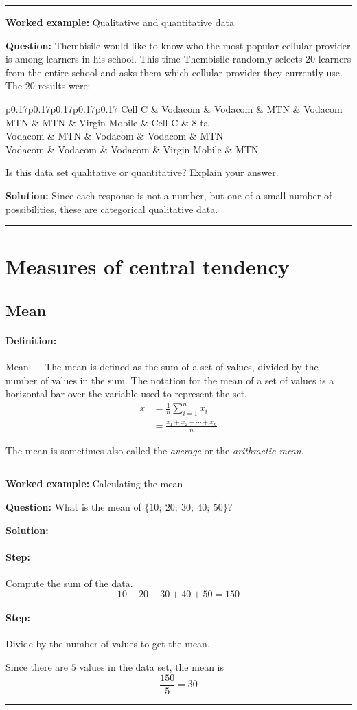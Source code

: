 \documentclass[a4paper,11pt]{report}
\def\Definition#1#2{\paragraph{Definition:} #1 --- #2}
\newenvironment{wex}[3]%
{\rule{\linewidth}{0.5mm}
\textbf{Worked example:} #1

\textbf{Question:} #2

\textbf{Solution:} #3}%
{\rule{\linewidth}{0.5mm}}
\newcommand{\westep}[1]{\paragraph{Step:} #1}
\begin{document}
\begin{wex}{Qualitative and quantitative data}{
    Thembisile would like to know who the most popular cellular
    provider is among learners in his school. This time Thembisile
    randomly selects $20$ learners from the entire school and asks them
    which cellular provider they currently use. The $20$ results were:

    \begin{center}
      \begin{tabular}{p{0.17\textwidth}p{0.17\textwidth}p{0.17\textwidth}p{0.17\textwidth}p{0.17\textwidth}}
        \toprule
        Cell C & Vodacom & Vodacom & MTN & Vodacom \\
        MTN & MTN & Virgin Mobile & Cell C & 8-ta \\
        Vodacom & MTN & Vodacom & Vodacom & MTN \\
        Vodacom & Vodacom & Vodacom & Virgin Mobile & MTN \\
        \bottomrule
      \end{tabular}
    \end{center}

    Is this data set qualitative or quantitative? Explain your answer.
}{
  Since each response is not a number, but one of a small number of
  possibilities, these are categorical qualitative data.

}
\end{wex}

\section{Measures of central tendency}

\subsection{Mean}
\Definition{Mean}{The mean is defined as the sum of a set of values,
  divided by the number of values in the sum.  The notation for the
  mean of a set of values is a horizontal bar over the variable used
  to represent the set.
  \begin{align}
    \overline{x} &= \frac{1}{n}\sum_{i=1}^n x_i \\
                 &= \frac{x_1 + x_2 + \cdots + x_n}{n}
  \end{align}
}

The mean is sometimes also called the {\em average} or the {\em
  arithmetic mean}.

\begin{wex}{Calculating the mean}{
    What is the mean of $\{10;\ 20;\ 30;\ 40;\ 50\}$?
}{
  \westep{Compute the sum of the data.}
  \begin{equation}
    10 + 20 + 30 + 40 + 50 = 150
  \end{equation}

  \westep{Divide by the number of values to get the mean.}

  Since there are $5$ values in the data set, the mean is
  \begin{equation}
    \frac{150}{5} = 30
  \end{equation}
}
\end{wex}
\end{document}
